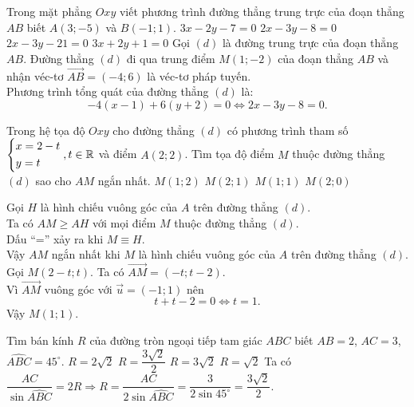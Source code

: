 \begin{ex}%
 Trong mặt phẳng $Oxy$ viết phương trình đường thẳng trung trực của đoạn thẳng $AB$ biết $A(3;-5)$ và $B(-1;1)$.
 \choice
  {$3x - 2y - 7 = 0$}
  {\True $2x - 3y - 8 = 0$}
  {$2x - 3y - 21 = 0$}
  {$3x + 2y + 1 = 0$}
 \loigiai
 {
 Gọi $(d)$ là đường trung trực của đoạn thẳng $AB$. Đường thẳng $(d)$ đi qua trung điểm $M(1;-2)$ của đoạn thẳng $AB$ và nhận véc-tơ $\vec{AB} = (-4;6)$ là véc-tơ pháp tuyến.\\
 Phương trình tổng quát của đường thẳng $(d)$ là:
 $$-4(x - 1) + 6(y + 2) = 0 \Leftrightarrow 2x - 3y - 8 = 0.$$
 }
\end{ex}


\begin{ex}%
 Trong hệ tọa độ $Oxy$ cho đường thẳng $(d)$ có phương trình tham số $\left\{\begin{aligned}& x = 2 - t \\& y = t\end{aligned}\right., t \in \mathbb{R}$ và điểm $A(2;2)$. Tìm tọa độ điểm $M$ thuộc đường thẳng $(d)$ sao cho $AM$ ngắn nhất.
 \choice
  {$M(1;2)$}
  {$M(2;1)$}
  {\True $M(1;1)$}
  {$M(2;0)$}
 \loigiai
 {
 \immini
 {
 Gọi $H$ là hình chiếu vuông góc của $A$ trên đường thẳng $(d)$.\\
 Ta có $AM \geq AH$ với mọi điểm $M$ thuộc đường thẳng $(d)$.\\
 Dấu ``='' xảy ra khi $M \equiv H$.\\
 Vậy $AM$ ngắn nhất khi $M$ là hình chiếu vuông góc của $A$ trên đường thẳng $(d)$.\\
 Gọi $M(2-t; t)$. Ta có $\vec{AM} = (-t; t-2)$.\\
 Vì $\vec{AM}$ vuông góc với $\vec{u} = (-1;1)$ nên
 $$t + t - 2 = 0 \Leftrightarrow t = 1.$$
 Vậy $M(1;1)$.
 }
 {
 }
 }
\end{ex}


\begin{ex}%
 Tìm bán kính $R$ của đường tròn ngoại tiếp tam giác $ABC$ biết $AB = 2$, $AC = 3$, $\widehat{ABC} = 45^\circ$.
 \choice
  {$R = 2\sqrt{2}$}
  {\True $R = \dfrac{3\sqrt{2}}{2}$}
  {$R = 3\sqrt{2}$}
  {$R = \sqrt{2}$}
 \loigiai
 {
 Ta có $\dfrac{AC}{\sin \widehat{ABC}} = 2R \Rightarrow R = \dfrac{AC}{2\sin \widehat{ABC}} = \dfrac{3}{2 \sin 45^\circ} = \dfrac{3\sqrt{2}}{2}.$
 }
\end{ex}


